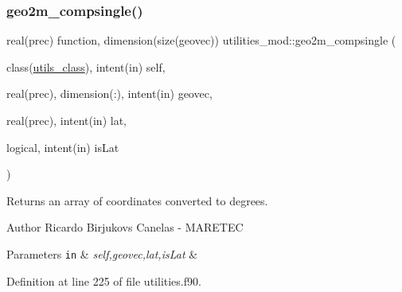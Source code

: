 \subsubsection{\texorpdfstring{geo2m\+\_\+compsingle()}{geo2m\_compsingle()}}
{\footnotesize\ttfamily real(prec) function, dimension(size(geovec)) utilities\+\_\+mod\+::geo2m\+\_\+compsingle (\begin{DoxyParamCaption}\item[{class(\mbox{\hyperlink{structutilities__mod_1_1utils__class}{utils\+\_\+class}}), intent(in)}]{self,  }\item[{real(prec), dimension(\+:), intent(in)}]{geovec,  }\item[{real(prec), intent(in)}]{lat,  }\item[{logical, intent(in)}]{is\+Lat }\end{DoxyParamCaption})\hspace{0.3cm}{\ttfamily [private]}}



Returns an array of coordinates converted to degrees. 

\begin{DoxyAuthor}{Author}
Ricardo Birjukovs Canelas -\/ M\+A\+R\+E\+T\+EC 
\end{DoxyAuthor}

\begin{DoxyParams}[1]{Parameters}
\mbox{\tt in}  & {\em self,geovec,lat,is\+Lat} & \\
\hline
\end{DoxyParams}


Definition at line 225 of file utilities.\+f90.


